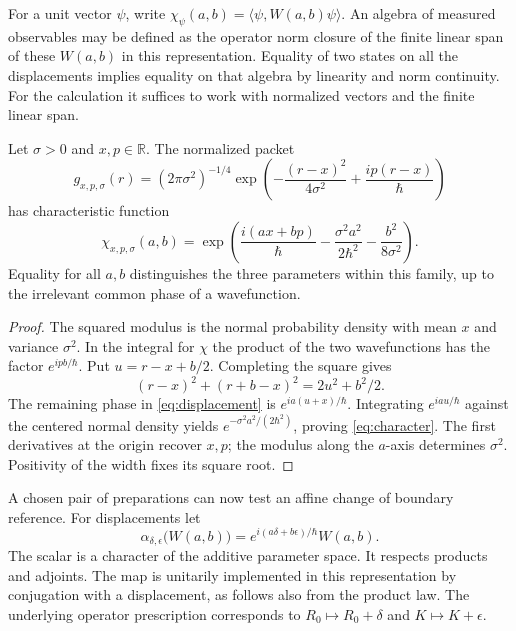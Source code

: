 \documentclass[11pt,letterpaper]{article}
\newcommand{\RR}{\mathbb R}
\begin{document}
For a unit vector $\psi$, write $\chi_\psi(a,b)=\langle\psi,W(a,b)\psi\rangle$. An algebra of
measured observables may be defined as the operator norm closure of the finite linear span of
these $W(a,b)$ in this representation. Equality of two states on all the displacements implies
equality on that algebra by linearity and norm continuity. For the calculation it suffices to
work with normalized vectors and the finite linear span.

\begin{proposition}\label{prop:gaussian}
Let $\sigma>0$ and $x,p\in\RR$. The normalized packet
\[
 g_{x,p,\sigma}(r)=
 (2\pi\sigma^2)^{-1/4}
 \exp\left(-\frac{(r-x)^2}{4\sigma^2}
           +\frac{ip(r-x)}{\hbar}\right)
\]
has characteristic function
\begin{equation}
 \chi_{x,p,\sigma}(a,b)=
 \exp\left(\frac{i(ax+bp)}{\hbar}
           -\frac{\sigma^2 a^2}{2\hbar^2}
           -\frac{b^2}{8\sigma^2}\right).
 \label{eq:character}
\end{equation}
Equality for all $a,b$ distinguishes the three parameters within this family, up to the
irrelevant common phase of a wavefunction.
\end{proposition}
\begin{proof}
The squared modulus is the normal probability density with mean $x$ and variance $\sigma^2$. In
the integral for $\chi$ the product of the two wavefunctions has the factor $e^{ipb/\hbar}$.
Put $u=r-x+b/2$. Completing the square gives
\[
 (r-x)^2+(r+b-x)^2=2u^2+b^2/2 .
\]
The remaining phase in \eqref{eq:displacement} is $e^{ia(u+x)/\hbar}$. Integrating
$e^{iau/\hbar}$ against the centered normal density yields $e^{-\sigma^2 a^2/(2\hbar^2)}$,
proving \eqref{eq:character}. The first derivatives at the origin recover $x,p$; the modulus
along the $a$-axis determines $\sigma^2$. Positivity of the width fixes its square root.
\end{proof}

A chosen pair of preparations can now test an affine change of boundary reference. For displacements let
\[
 \alpha_{\delta,\epsilon}\bigl(W(a,b)\bigr)=
 e^{i(a\delta+b\epsilon)/\hbar}W(a,b).
\]
The scalar is a character of the additive parameter space. It respects products and adjoints.
The map is unitarily implemented in this representation by conjugation with a displacement, as
follows also from the product law. The underlying operator prescription corresponds to
$R_0\mapsto R_0+\delta$ and $K\mapsto K+\epsilon$.
\end{document}

